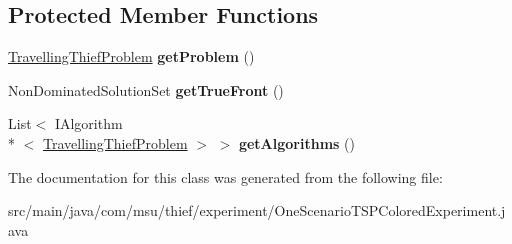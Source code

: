 \subsection*{Protected Member Functions}
\begin{DoxyCompactItemize}
\item 
\hypertarget{classcom_1_1msu_1_1thief_1_1experiment_1_1OneScenarioTSPColoredExperiment_a5e012ded17bc520c2c51ef663004429e}{\hyperlink{classcom_1_1msu_1_1thief_1_1problems_1_1TravellingThiefProblem}{Travelling\-Thief\-Problem} {\bfseries get\-Problem} ()}\label{classcom_1_1msu_1_1thief_1_1experiment_1_1OneScenarioTSPColoredExperiment_a5e012ded17bc520c2c51ef663004429e}

\item 
\hypertarget{classcom_1_1msu_1_1thief_1_1experiment_1_1OneScenarioTSPColoredExperiment_a185d64989e65fe2182c809f92c3fbccb}{Non\-Dominated\-Solution\-Set {\bfseries get\-True\-Front} ()}\label{classcom_1_1msu_1_1thief_1_1experiment_1_1OneScenarioTSPColoredExperiment_a185d64989e65fe2182c809f92c3fbccb}

\item 
\hypertarget{classcom_1_1msu_1_1thief_1_1experiment_1_1OneScenarioTSPColoredExperiment_a534b72a05996c4640e8c7c607b2b75ee}{List$<$ I\-Algorithm\\*
$<$ \hyperlink{classcom_1_1msu_1_1thief_1_1problems_1_1TravellingThiefProblem}{Travelling\-Thief\-Problem} $>$ $>$ {\bfseries get\-Algorithms} ()}\label{classcom_1_1msu_1_1thief_1_1experiment_1_1OneScenarioTSPColoredExperiment_a534b72a05996c4640e8c7c607b2b75ee}

\end{DoxyCompactItemize}


The documentation for this class was generated from the following file\-:\begin{DoxyCompactItemize}
\item 
src/main/java/com/msu/thief/experiment/One\-Scenario\-T\-S\-P\-Colored\-Experiment.\-java\end{DoxyCompactItemize}
